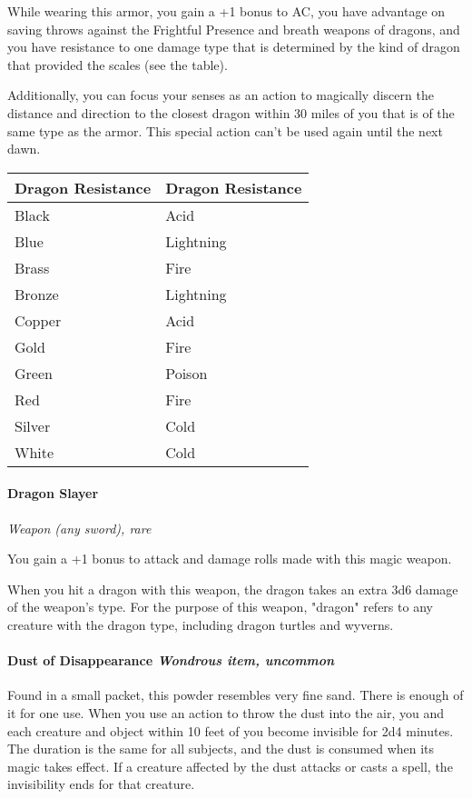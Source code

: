 \documentclass[
]{article}
\begin{document}
While wearing this armor, you gain a +1 bonus to AC, you have advantage
on saving throws against the Frightful Presence and breath weapons of
dragons, and you have resistance to one damage type that is determined
by the kind of dragon that provided the scales (see the table).

Additionally, you can focus your senses as an action to magically
discern the distance and direction to the closest dragon within 30 miles
of you that is of the same type as the armor. This special action can't
be used again until the next dawn.

\begin{longtable}[]{@{}ll@{}}
\toprule
Dragon Resistance & Dragon Resistance\tabularnewline
\midrule
\endhead
Black & Acid\tabularnewline
Blue & Lightning\tabularnewline
Brass & Fire\tabularnewline
Bronze & Lightning\tabularnewline
Copper & Acid\tabularnewline
Gold & Fire\tabularnewline
Green & Poison\tabularnewline
Red & Fire\tabularnewline
Silver & Cold\tabularnewline
White & Cold\tabularnewline
\bottomrule
\end{longtable}

\hypertarget{dragon-slayer}{%
\paragraph{Dragon Slayer}\label{dragon-slayer}}

\emph{Weapon (any sword), rare}

You gain a +1 bonus to attack and damage rolls made with this magic
weapon.

When you hit a dragon with this weapon, the dragon takes an extra 3d6
damage of the weapon's type. For the purpose of this weapon, "dragon"
refers to any creature with the dragon type, including dragon turtles
and wyverns.

\hypertarget{dust-of-disappearance-wondrous-item-uncommon}{%
\paragraph{\texorpdfstring{Dust of Disappearance \emph{Wondrous item,
uncommon}}{Dust of Disappearance Wondrous item, uncommon}}\label{dust-of-disappearance-wondrous-item-uncommon}}

Found in a small packet, this powder resembles very fine sand. There is
enough of it for one use. When you use an action to throw the dust into
the air, you and each creature and object within 10 feet of you become
invisible for 2d4 minutes. The duration is the same for all subjects,
and the dust is consumed when its magic takes effect. If a creature
affected by the dust attacks or casts a spell, the invisibility ends for
that creature.
\end{document}
